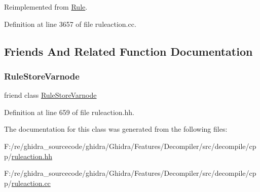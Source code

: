 Reimplemented from \mbox{\hyperlink{class_rule_a4023bfc7825de0ab866790551856d10e}{Rule}}.



Definition at line 3657 of file ruleaction.\+cc.



\subsection{Friends And Related Function Documentation}
\mbox{\label{class_rule_load_varnode_a47339c30a4916725f6225aa5d2bdfe47}} 
\subsubsection{\texorpdfstring{RuleStoreVarnode}{RuleStoreVarnode}}
{\footnotesize\ttfamily friend class \mbox{\hyperlink{class_rule_store_varnode}{Rule\+Store\+Varnode}}\hspace{0.3cm}{\ttfamily [friend]}}



Definition at line 659 of file ruleaction.\+hh.



The documentation for this class was generated from the following files\+:\begin{DoxyCompactItemize}
\item 
F\+:/re/ghidra\+\_\+sourcecode/ghidra/\+Ghidra/\+Features/\+Decompiler/src/decompile/cpp/\mbox{\hyperlink{ruleaction_8hh}{ruleaction.\+hh}}\item 
F\+:/re/ghidra\+\_\+sourcecode/ghidra/\+Ghidra/\+Features/\+Decompiler/src/decompile/cpp/\mbox{\hyperlink{ruleaction_8cc}{ruleaction.\+cc}}\end{DoxyCompactItemize}
